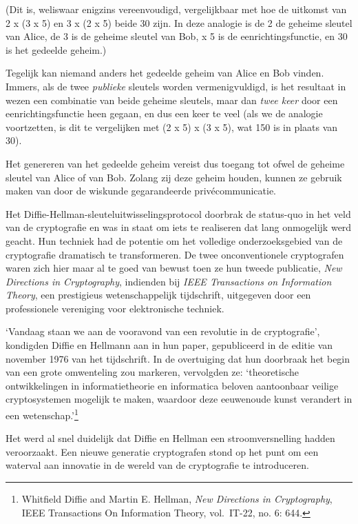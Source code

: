 \documentclass[
  a5paper,
  smalldemyvopaper,11pt,twoside,onecolumn,openright,extrafontsizes,
hidelinks]{memoir}
\begin{document}
(Dit is, weliswaar enigzins vereenvoudigd, vergelijkbaar met hoe de
uitkomst van 2 x (3 x 5) en 3 x (2 x 5) beide 30 zijn. In deze analogie
is de 2 de geheime sleutel van Alice, de 3 is de geheime sleutel van
Bob, x 5 is de eenrichtingsfunctie, en 30 is het gedeelde geheim.)

Tegelijk kan niemand anders het gedeelde geheim van Alice en Bob vinden.
Immers, als de twee \emph{publieke} sleutels worden vermenigvuldigd, is
het resultaat in wezen een combinatie van beide geheime sleutels, maar
dan \emph{twee keer} door een eenrichtingsfunctie heen gegaan, en dus
een keer te veel (als we de analogie voortzetten, is dit te vergelijken
met (2 x 5) x (3 x 5), wat 150 is in plaats van 30).

Het genereren van het gedeelde geheim vereist dus toegang tot ofwel de
geheime sleutel van Alice of van Bob. Zolang zij deze geheim houden,
kunnen ze gebruik maken van door de wiskunde gegarandeerde
privécommunicatie.

Het Diffie-Hellman-sleuteluitwisselingsprotocol doorbrak de status-quo
in het veld van de cryptografie en was in staat om iets te realiseren
dat lang onmogelijk werd geacht. Hun techniek had de potentie om het
volledige onderzoeksgebied van de cryptografie dramatisch te
transformeren. De twee onconventionele cryptografen waren zich hier maar
al te goed van bewust toen ze hun tweede publicatie, \emph{New
Directions in Cryptography}, indienden bij \emph{IEEE Transactions on
Information Theory}, een prestigieus wetenschappelijk tijdschrift,
uitgegeven door een professionele vereniging voor elektronische
techniek.

`Vandaag staan we aan de vooravond van een revolutie in de
cryptografie', kondigden Diffie en Hellmann aan in hun paper,
gepubliceerd in de editie van november 1976 van het tijdschrift. In de
overtuiging dat hun doorbraak het begin van een grote omwenteling zou
markeren, vervolgden ze: `theoretische ontwikkelingen in
informatietheorie en informatica beloven aantoonbaar veilige
cryptosystemen mogelijk te maken, waardoor deze eeuwenoude kunst
verandert in een wetenschap.'\footnote{\hspace{0pt}Whitfield Diffie and
  Martin E. Hellman, \emph{New Directions in Cryptography}, IEEE
  Transactions On Information Theory, vol.~IT-22, no. 6: 644.}

Het werd al snel duidelijk dat Diffie en Hellman een stroomversnelling
hadden veroorzaakt. Een nieuwe generatie cryptografen stond op het punt
om een waterval aan innovatie in de wereld van de cryptografie te
introduceren.
\end{document}
